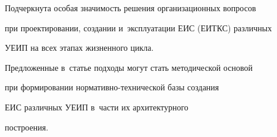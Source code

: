      Подчеркнута особая значимость решения организационных вопросов 

при проектировании, создании и~эксплуатации ЕИС (ЕИТКС) различных 

УЕИП на всех этапах жизненного цикла.

     

     Предложенные в~статье подходы могут стать методической основой 

при формировании нормативно-технической базы создания 

ЕИС различных УЕИП в~части их архитектурного 

построения.



\vspace*{-6pt}

     

